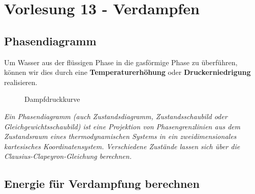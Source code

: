 \documentclass[a4paper,10pt]{article}
\begin{document}
\sidebar
{}
\par \vspace*{5mm}
\section{Vorlesung 13 - Verdampfen}

\subsection{Phasendiagramm}
Um Wasser aus der flüssigen Phase in die gasförmige Phase zu überführen, können wir dies durch eine \textbf{Temperaturerhöhung} oder \textbf{Druckerniedrigung} realisieren.





\begin{figure}[h]
\centering
{}
\caption{Dampfdruckkurve}
\end{figure}
\footnotesize
\textit{Ein Phasendiagramm (auch Zustandsdiagramm, Zustandsschaubild oder Gleichgewichtsschaubild) ist eine Projektion von Phasengrenzlinien aus dem Zustandsraum eines thermodynamischen Systems in ein zweidimensionales kartesisches Koordinatensystem. Verschiedene Zustände lassen sich über die Clausius-Clapeyron-Gleichung berechnen.}
\normalsize



\subsection{Energie für Verdampfung berechnen}
\end{document}
